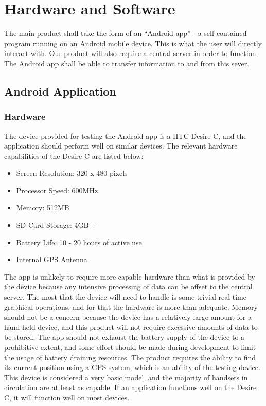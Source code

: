 \section{Hardware and Software}
	The main product shall take the form of an ``Android app'' - a self 
	contained program running on an Android mobile device. This is what the 
	user will directly interact with. Our product will also require a central 
	server in order to function. The Android app shall be able to transfer 
	information to and from this sever.
	\subsection{Android Application}
		\subsubsection{Hardware}
			The device provided for testing the Android app is a HTC Desire C, 
			and the application should perform well on similar devices. The 
			relevant hardware capabilities of the Desire C are listed
			below\cite{htcdesirex}:

			\begin{itemize}
				\item Screen Resolution: 320 x 480 pixels
				\item Processor Speed: 600MHz
				\item Memory: 512MB
				\item SD Card Storage: 4GB +
				\item Battery Life: 10 - 20 hours of active use
				\item Internal GPS Antenna
			\end{itemize}

			\noindent
			The app is unlikely to require more capable hardware than what is 
			provided by the device because any intensive processing of data 
			can be offset to the central server. The most that the device will 
			need to handle is some trivial real-time graphical operations, and 
			for that the hardware is more than adequate. Memory should not be 
			a concern because the device has a relatively large amount for a 
			hand-held device, and this product will not require excessive 
			amounts of data to be stored. The app should not exhaust the 
			battery supply of the device to a prohibitive extent, and some 
			effort should be made during development to limit the usage of 
			battery draining resources. The product requires the ability to 
			find its current position using a GPS system, which is an ability 
			of the testing device. This device is considered a very basic
			model, and the majority of handsets in circulation are at least as
			capable. If an application functions well on the Desire C, it will
			function well on most devices.
